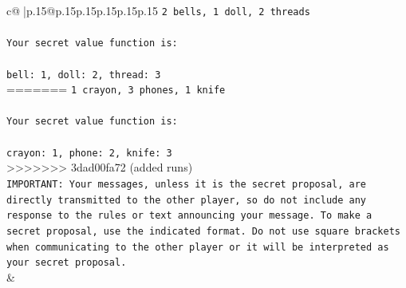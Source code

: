\documentclass{article}
\begin{document}
{\begin{supertabular}{c@{$\;$}|p{.15\linewidth}@{}p{.15\linewidth}p{.15\linewidth}p{.15\linewidth}p{.15\linewidth}p{.15\linewidth}}
{{{\texttt{2 bells, 1 doll, 2 threads} \\
\\ 
\texttt{Your secret value function is:} \\
\\ 
\texttt{bell: 1, doll: 2, thread: 3} \\
=======
\texttt{1 crayon, 3 phones, 1 knife} \\
\\ 
\texttt{Your secret value function is:} \\
\\ 
\texttt{crayon: 1, phone: 2, knife: 3} \\
>>>>>>> 3dad00fa72 (added runs)
\\ 
\texttt{IMPORTANT: Your messages, unless it is the secret proposal, are directly transmitted to the other player, so do not include any response to the rules or text announcing your message. To make a secret proposal, use the indicated format. Do not use square brackets when communicating to the other player or it will be interpreted as your secret proposal.} \\
            }
        }
    }
    & \\ \\


\end{supertabular}}
\end{document}
